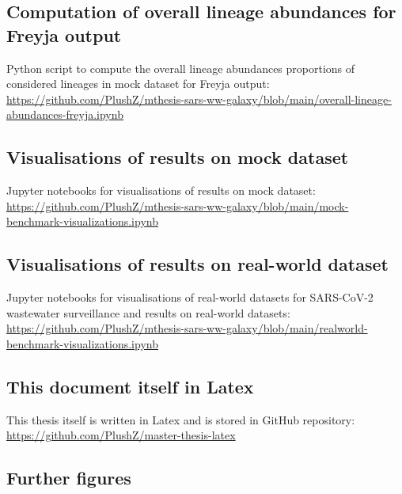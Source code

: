     \subsection{Computation of overall lineage abundances for Freyja output} \label{sec:appendix:recompute-freyja}
    Python script to compute the overall lineage abundances proportions of considered lineages in mock dataset for Freyja output:\\
    \url{https://github.com/PlushZ/mthesis-sars-ww-galaxy/blob/main/overall-lineage-abundances-freyja.ipynb}
    
    \subsection{Visualisations of results on mock dataset} \label{sec:appendix:mock-visualize}
    Jupyter notebooks for visualisations of results on mock dataset: \\
    \url{https://github.com/PlushZ/mthesis-sars-ww-galaxy/blob/main/mock-benchmark-visualizations.ipynb} 
    
    \subsection{Visualisations of results on real-world dataset} \label{sec:appendix:real-visualize}
    Jupyter notebooks for visualisations of real-world datasets for SARS-CoV-2 wastewater surveillance and results on real-world datasets: \\
    \url{https://github.com/PlushZ/mthesis-sars-ww-galaxy/blob/main/realworld-benchmark-visualizations.ipynb}
    
    \subsection{This document itself in Latex} \label{sec:appendix:real-visualize}
    This thesis itself is written in Latex and is stored in GitHub repository: \\
    \url{https://github.com/PlushZ/master-thesis-latex}


    \subsection{Further figures}
